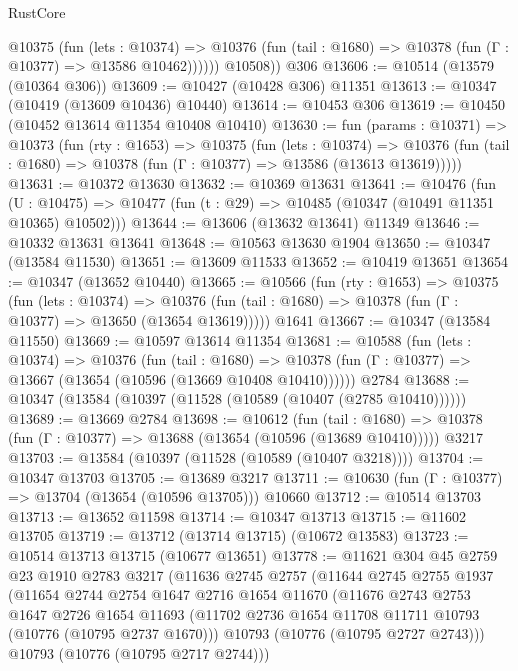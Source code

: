 \begin{lexlean}{RustCore}
\begin{coremodule}
            @10375
              (fun (lets : @10374) =>
              @10376 (fun (tail : @1680) => @10378 (fun (Γ : @10377) => @13586 @10462))))))
        @10508))
    @306
@13606 := @10514 (@13579 (@10364 @306))
@13609 := @10427 (@10428 @306) @11351
@13613 := @10347 (@10419 (@13609 @10436) @10440)
@13614 := @10453 @306
@13619 := @10450 (@10452 @13614 @11354 @10408 @10410)
@13630 := fun (params : @10371) =>
  @10373
    (fun (rty : @1653) =>
    @10375
      (fun (lets : @10374) =>
      @10376 (fun (tail : @1680) => @10378 (fun (Γ : @10377) => @13586 (@13613 @13619)))))
@13631 := @10372 @13630
@13632 := @10369 @13631
@13641 := @10476
    (fun (U : @10475) => @10477 (fun (t : @29) => @10485 (@10347 (@10491 @11351 @10365) @10502)))
@13644 := @13606 (@13632 @13641) @11349
@13646 := @10332 @13631 @13641
@13648 := @10563 @13630 @1904
@13650 := @10347 (@13584 @11530)
@13651 := @13609 @11533
@13652 := @10419 @13651
@13654 := @10347 (@13652 @10440)
@13665 := @10566
    (fun (rty : @1653) =>
    @10375
      (fun (lets : @10374) =>
      @10376 (fun (tail : @1680) => @10378 (fun (Γ : @10377) => @13650 (@13654 @13619)))))
    @1641
@13667 := @10347 (@13584 @11550)
@13669 := @10597 @13614 @11354
@13681 := @10588
    (fun (lets : @10374) =>
    @10376
      (fun (tail : @1680) =>
      @10378 (fun (Γ : @10377) => @13667 (@13654 (@10596 (@13669 @10408 @10410))))))
    @2784
@13688 := @10347 (@13584 (@10397 (@11528 (@10589 (@10407 (@2785 @10410))))))
@13689 := @13669 @2784
@13698 := @10612
    (fun (tail : @1680) => @10378 (fun (Γ : @10377) => @13688 (@13654 (@10596 (@13689 @10410)))))
    @3217
@13703 := @13584 (@10397 (@11528 (@10589 (@10407 @3218))))
@13704 := @10347 @13703
@13705 := @13689 @3217
@13711 := @10630 (fun (Γ : @10377) => @13704 (@13654 (@10596 @13705))) @10660
@13712 := @10514 @13703
@13713 := @13652 @11598
@13714 := @10347 @13713
@13715 := @11602 @13705
@13719 := @13712 (@13714 @13715) (@10672 @13583)
@13723 := @10514 @13713 @13715 (@10677 @13651)
@13778 := @11621
    @304
    @45
    @2759
    @23
    @1910
    @2783
    @3217
    (@11636
      @2745
      @2757
      (@11644
        @2745
        @2755
        @1937
        (@11654
          @2744
          @2754
          @1647
          @2716
          @1654
          @11670
          (@11676
            @2743
            @2753
            @1647
            @2726
            @1654
            @11693
            (@11702 @2736 @1654 @11708 @11711 @10793 (@10776 (@10795 @2737 @1670)))
            @10793
            (@10776 (@10795 @2727 @2743)))
          @10793
          (@10776 (@10795 @2717 @2744)))

\end{coremodule}
\end{lexlean}
